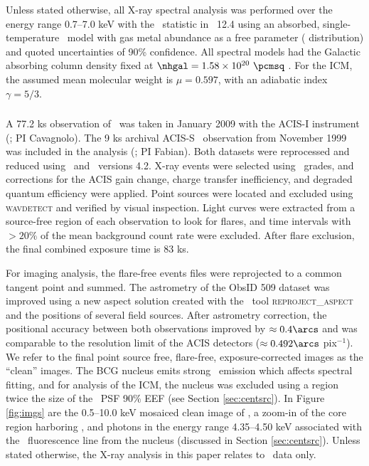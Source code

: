 \documentclass[useAMS,usenatbib]{mn2e}
\begin{document}
Unless stated otherwise, all X-ray spectral analysis was performed
over the energy range 0.7--7.0 keV with the \chisq\ statistic in
\xspec\ 12.4 \citep{xspec} using an absorbed, single-temperature
\mekal\ model \citep{mekal1} with gas metal abundance as a free
parameter (\citealt{ag89} distribution) and quoted uncertainties of
90\% confidence. All spectral models had the Galactic absorbing column
density fixed at $\nhgal = 1.58 \times 10^{20} ~\pcmsq$
\citep{lab}. For the ICM, the assumed mean molecular weight is $\mu =
0.597$, with an adiabatic index $\gamma = 5/3$.

\subsubsection{\cxo}

A 77.2 ks observation of \irs\ was taken in January 2009 with the
ACIS-I instrument (; PI
Cavagnolo). The 9 ks archival ACIS-S \cxo\ observation from
November 1999 was included in the analysis (; PI Fabian). Both datasets were
reprocessed and reduced using \ciao\ and \caldb\ versions 4.2. X-ray
events were selected using \asca\ grades, and corrections for the ACIS
gain change, charge transfer inefficiency, and degraded quantum
efficiency were applied. Point sources were located and excluded using
{\textsc{wavdetect}} and verified by visual inspection. Light curves
were extracted from a source-free region of each observation to look
for flares, and time intervals with $> 20\%$ of the mean background
count rate were excluded. After flare exclusion, the final combined
exposure time is 83 ks.

For imaging analysis, the flare-free events files were reprojected to
a common tangent point and summed. The astrometry of the ObsID 509
dataset was improved using a new aspect solution created with the
\ciao\ tool {\textsc{reproject\_aspect}} and the positions of several
field sources. After astrometry correction, the positional accuracy
between both observations improved by $\approx 0.4\arcs$ and was
comparable to the resolution limit of the ACIS detectors ($\approx
0.492\arcs$ pix$^{-1}$). We refer to the final point source free,
flare-free, exposure-corrected images as the ``clean'' images. The BCG
nucleus emits strong \feka\ emission which affects spectral fitting,
and for analysis of the ICM, the nucleus was excluded using a region
twice the size of the \cxo\ PSF 90\% EEF (see Section
\ref{sec:centsrc}). In Figure \ref{fig:imgs} are the 0.5--10.0 keV
mosaiced clean image of \rxj, a zoom-in of the core region harboring
\irs, and photons in the energy range 4.35--4.50 keV associated with
the \feka\ fluorescence line from the nucleus (discussed in Section
\ref{sec:centsrc}). Unless stated otherwise, the X-ray analysis in
this paper relates to \cxo\ data only.
\end{document}
